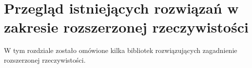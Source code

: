 \chapter{Przegląd istniejących rozwiązań w zakresie rozszerzonej rzeczywistości}
\label{cha:przegladIstniejacychRozwiazanWZakresieRozszerzonejRzeczywistosci}

W tym rozdziale zostało omówione kilka bibliotek rozwiązujących zagadnienie rozszerzonej rzeczywistości.














